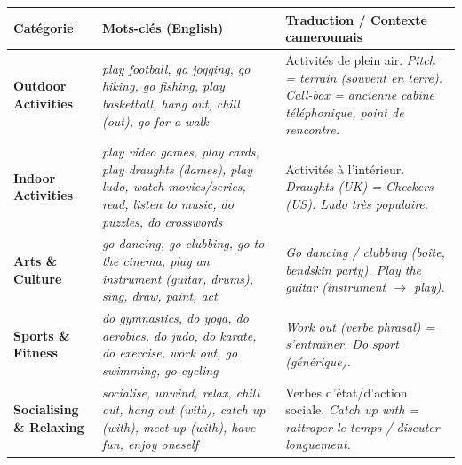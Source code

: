 \documentclass[11pt]{article}
\newcommand{\eng}[1]{\ifmmode\text{\textit{#1}}\else\begingroup\selectlanguage{english}\itshape #1\endgroup\fi}
\begin{document}
\begin{definition}
\begin{center}
\begin{tabularx}{\linewidth}{|X|X|X|}
\hline
\rowcolor{popblueL} \textbf{Catégorie} & \textbf{Mots-clés (English)} & \textbf{Traduction / Contexte camerounais} \\
\hline
\textbf{Outdoor Activities} & \eng{play football, go jogging, go hiking, go fishing, play basketball, hang out, chill (out), go for a walk} & Activités de plein air. \eng{Pitch} = terrain (souvent en terre). \eng{Call-box} = ancienne cabine téléphonique, point de rencontre. \\
\hline
\textbf{Indoor Activities} & \eng{play video games, play cards, play draughts (dames), play ludo, watch movies/series, read, listen to music, do puzzles, do crosswords} & Activités à l'intérieur. \eng{Draughts} (UK) = \eng{Checkers} (US). \eng{Ludo} très populaire. \\
\hline
\textbf{Arts \& Culture} & \eng{go dancing, go clubbing, go to the cinema, play an instrument (guitar, drums), sing, draw, paint, act} & \eng{Go dancing / clubbing} (boîte, \eng{bendskin} party). \eng{Play the guitar} (instrument $\to$ \eng{play}). \\
\hline
\textbf{Sports \& Fitness} & \eng{do gymnastics, do yoga, do aerobics, do judo, do karate, do exercise, work out, go swimming, go cycling} & \eng{Work out} (verbe phrasal) = s'entraîner. \eng{Do sport} (générique). \\
\hline
\textbf{Socialising \& Relaxing} & \eng{socialise, unwind, relax, chill out, hang out (with), catch up (with), meet up (with), have fun, enjoy oneself} & Verbes d'état/d'action sociale. \eng{Catch up with} = rattraper le temps / discuter longuement. \\
\hline
\end{tabularx}
\end{center}
\end{definition}
\end{document}
